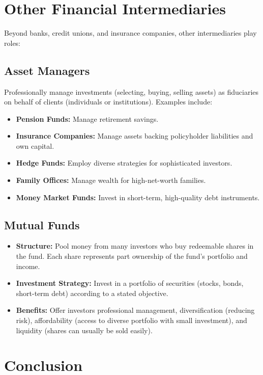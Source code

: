 \section{Other Financial Intermediaries}

Beyond banks, credit unions, and insurance companies, other intermediaries play roles:

\subsection{Asset Managers}
Professionally manage investments (selecting, buying, selling assets) as fiduciaries on behalf of clients (individuals or institutions). Examples include:
\begin{itemize}
    \item \textbf{Pension Funds:} Manage retirement savings.
    \item \textbf{Insurance Companies:} Manage assets backing policyholder liabilities and own capital.
    \item \textbf{Hedge Funds:} Employ diverse strategies for sophisticated investors.
    \item \textbf{Family Offices:} Manage wealth for high-net-worth families.
    \item \textbf{Money Market Funds:} Invest in short-term, high-quality debt instruments.
\end{itemize}

\subsection{Mutual Funds}
\begin{itemize}
    \item \textbf{Structure:} Pool money from many investors who buy redeemable shares in the fund. Each share represents part ownership of the fund's portfolio and income.
    \item \textbf{Investment Strategy:} Invest in a portfolio of securities (stocks, bonds, short-term debt) according to a stated objective.
    \item \textbf{Benefits:} Offer investors professional management, diversification (reducing risk), affordability (access to diverse portfolio with small investment), and liquidity (shares can usually be sold easily).
\end{itemize}

\section{Conclusion}

